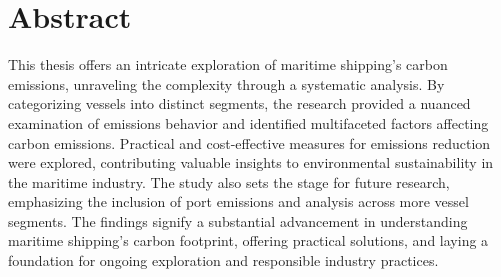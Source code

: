 \chapter*{Abstract}


This thesis offers an intricate exploration of maritime shipping's carbon emissions, unraveling the complexity through a systematic analysis. 
By categorizing vessels into distinct segments, the research provided a nuanced examination of emissions behavior and identified multifaceted factors affecting carbon emissions. 
Practical and cost-effective measures for emissions reduction were explored, contributing valuable insights to environmental sustainability in the maritime industry. 
The study also sets the stage for future research, emphasizing the inclusion of port emissions and analysis across more vessel segments. 
The findings signify a substantial advancement in understanding maritime shipping's carbon footprint, offering practical solutions, and laying a foundation for ongoing exploration and responsible industry practices.